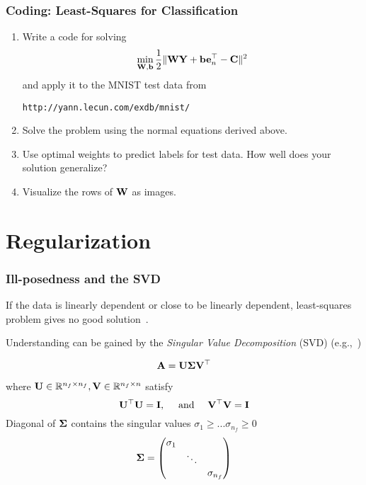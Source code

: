 \documentclass[12pt,fleqn,handout]{beamer}
\begin{document}
\begin{frame}
	\frametitle{Coding: Least-Squares for Classification}
	
	\begin{enumerate}
		\item Write a code for solving
		$$
		\min_{{\bf W},{\bf b}} {\frac 12}\| {\bf W}{\bf Y} + {\bf b} {\bf e}_n^\top - {\bf C} \|^2
		$$
		and apply it to the MNIST test data from
		\begin{center}
			\texttt{http://yann.lecun.com/exdb/mnist/}
		\end{center}
		
		\item Solve the problem using the normal equations derived above.
		
		\item Use optimal weights to predict labels for test data. How well does your solution generalize?
		
		\item Visualize the rows of ${\bf W}$ as images.
		
	\end{enumerate}
	
	\bigskip
	
\end{frame}
\section{Regularization} 
\label{sec:bias_variance}

\begin{frame}\frametitle{Ill-posedness and the SVD}

If the data is linearly dependent or close to be linearly dependent, least-squares problem gives no good solution~\cite{Hansen1998,Vogel2002,Hansen2010}.

Understanding can be gained by the \emph{Singular Value Decomposition} (SVD) (e.g.,~\cite[Ch. 8]{AscherGreif2011})

$$ {\bf A} = {\bf U} {\boldsymbol \Sigma} {\bf V}^{\top} $$

where ${\bf U} \in \mathbb{R}^{n_f\times n_f}, {\bf V}\in\mathbb{R}^{n_f \times n}$ satisfy
$$  {\bf U}^{\top} {\bf U} = {\bf I}, \quad \text{ and } \quad {\bf V}^{\top} {\bf V} = {\bf I} $$
Diagonal of ${\boldsymbol \Sigma}$ contains the singular values $\sigma_1 \geq ... \sigma_{n_f} \geq 0 $
$$ {\boldsymbol \Sigma} = \begin{pmatrix} \sigma_1  &  &  \\ &  \ddots &  \\ &  &  \sigma_{n_f} \end{pmatrix} $$

\end{frame}
\end{document}
